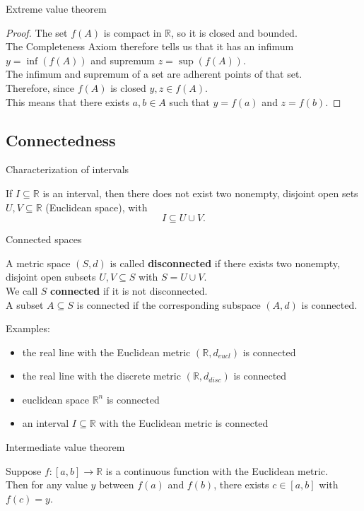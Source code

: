 \documentclass{beamer}
\begin{document}
\begin{frame}{Extreme value theorem}
\pause
\begin{proof}
\pause
The set $f(A)$ is compact in $\mathbb{R}$, so it is closed and bounded.\\
\pause
The Completeness Axiom therefore tells us that it has an infimum $y=\inf(f(A))$ and supremum $z=\sup(f(A))$.\\
\pause
The infimum and supremum of a set are adherent points of that set.\\
\pause
Therefore, since $f(A)$ is closed $y,z\in f(A)$.\\
\pause
This means that there exists $a,b\in A$ such that $y=f(a)$ and $z=f(b)$.
\end{proof}
\end{frame}

\subsection{Connectedness}

\begin{frame}{Characterization of intervals}
\begin{thm}
If $I\subseteq \mathbb{R}$ is an interval, then there does not exist two nonempty, disjoint open sets $U,V\subseteq\mathbb{R}$ (Euclidean space), with
$$I\subseteq U\cup V.$$
\end{thm}
\end{frame}

\begin{frame}{Connected spaces}
\begin{defn}
A metric space $(S,d)$ is called \textbf{disconnected} if there exists two nonempty, disjoint open subsets $U,V\subseteq S$ with $S=U\cup V$.\\
\pause
We call $S$ \textbf{connected} if it is not disconnected.\\
\pause
A subset $A\subseteq S$ is connected if the corresponding subspace $(A,d)$ is connected.
\end{defn}
\pause
Examples:
\begin{itemize}
\pause
\item the real line with the Euclidean metric $(\mathbb{R},d_{eucl})$ is connected
\pause
\item the real line with the discrete metric $(\mathbb{R},d_{disc})$ is connected
\pause
\item euclidean space $\mathbb{R}^n$ is connected
\pause
\item an interval $I\subseteq \mathbb{R}$ with the Euclidean metric is connected
\end{itemize}
\end{frame}

\begin{frame}{Intermediate value theorem}
\begin{thm}
Suppose $f: [a,b]\rightarrow\mathbb{R}$ is a continuous function with the Euclidean metric.\\
Then for any value $y$ between $f(a)$ and $f(b)$, there exists $c\in [a,b]$ with $f(c) =y$.
\end{thm}
\end{frame}
\end{document}
